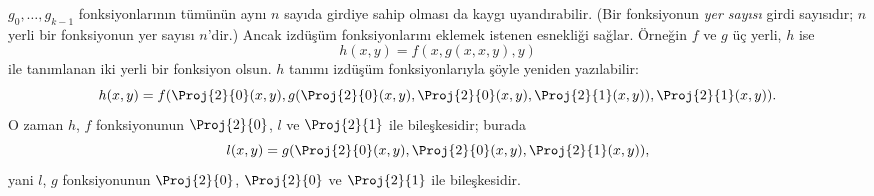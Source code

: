 \documentclass[../../../include/open-logic-section]{subfiles}
\begin{document}
$g_0,\dots,g_{k-1}$ fonksiyonlarının tümünün aynı $n$ sayıda girdiye
sahip olması da kaygı uyandırabilir. (Bir fonksiyonun \emph{yer sayısı}
girdi sayısıdır; $n$ yerli bir fonksiyonun yer sayısı $n$'dir.) Ancak
izdüşüm fonksiyonlarını eklemek istenen esnekliği sağlar. Örneğin $f$
ve $g$ üç yerli, $h$ ise
\[
h(x,y)=f(x,g(x,x,y),y)
\]
ile tanımlanan iki yerli bir fonksiyon olsun. $h$ tanımı izdüşüm
fonksiyonlarıyla şöyle yeniden yazılabilir:
\[
h(x,y) = f(\Proj{2}{0}(x,y), g(\Proj{2}{0}(x,y), \Proj{2}{0}(x,y),
\Proj{2}{1}(x,y)), \Proj{2}{1}(x,y)).
\]
O zaman $h$, $f$ fonksiyonunun $\Proj{2}{0}$, $l$ ve $\Proj{2}{1}$
ile bileşkesidir; burada
\[
l(x,y)=g(\Proj{2}{0}(x,y),\Proj{2}{0}(x,y),\Proj{2}{1}(x,y)),
\]
yani $l$, $g$ fonksiyonunun $\Proj{2}{0}$, $\Proj{2}{0}$ ve
$\Proj{2}{1}$ ile bileşkesidir.
\end{document}
